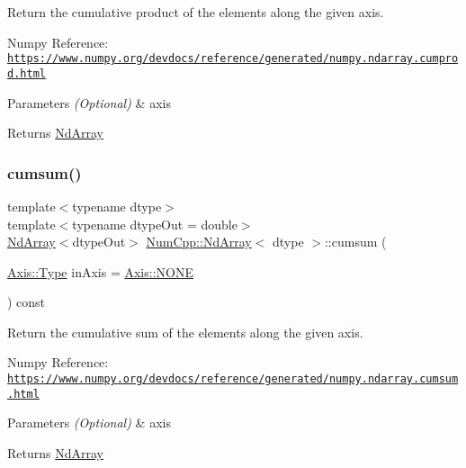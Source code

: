 Return the cumulative product of the elements along the given axis.

Numpy Reference\+: \href{https://www.numpy.org/devdocs/reference/generated/numpy.ndarray.cumprod.html}{\tt https\+://www.\+numpy.\+org/devdocs/reference/generated/numpy.\+ndarray.\+cumprod.\+html}


\begin{DoxyParams}{Parameters}
{\em (\+Optional)} & axis \\
\hline
\end{DoxyParams}
\begin{DoxyReturn}{Returns}
\mbox{\hyperlink{class_num_cpp_1_1_nd_array}{Nd\+Array}} 
\end{DoxyReturn}
\mbox{\label{class_num_cpp_1_1_nd_array_ab3c9386bc67e6618f22dca7072b9b548}} 
\subsubsection{\texorpdfstring{cumsum()}{cumsum()}}
{\footnotesize\ttfamily template$<$typename dtype$>$ \\
template$<$typename dtype\+Out  = double$>$ \\
\mbox{\hyperlink{class_num_cpp_1_1_nd_array}{Nd\+Array}}$<$dtype\+Out$>$ \mbox{\hyperlink{class_num_cpp_1_1_nd_array}{Num\+Cpp\+::\+Nd\+Array}}$<$ dtype $>$\+::cumsum (\begin{DoxyParamCaption}\item[{\mbox{\hyperlink{struct_num_cpp_1_1_axis_ac10eb76f8631762d9ed70c40c42ca6cb}{Axis\+::\+Type}}}]{in\+Axis = {\ttfamily \mbox{\hyperlink{struct_num_cpp_1_1_axis_ac10eb76f8631762d9ed70c40c42ca6cba747ae657022cca1d87702b56d0c038e9}{Axis\+::\+N\+O\+NE}}} }\end{DoxyParamCaption}) const\hspace{0.3cm}{\ttfamily [inline]}}

Return the cumulative sum of the elements along the given axis.

Numpy Reference\+: \href{https://www.numpy.org/devdocs/reference/generated/numpy.ndarray.cumsum.html}{\tt https\+://www.\+numpy.\+org/devdocs/reference/generated/numpy.\+ndarray.\+cumsum.\+html}


\begin{DoxyParams}{Parameters}
{\em (\+Optional)} & axis \\
\hline
\end{DoxyParams}
\begin{DoxyReturn}{Returns}
\mbox{\hyperlink{class_num_cpp_1_1_nd_array}{Nd\+Array}} 
\end{DoxyReturn}
\mbox{\label{class_num_cpp_1_1_nd_array_ad3b30513f29c3daec09f7e3ed39f5777}} 

